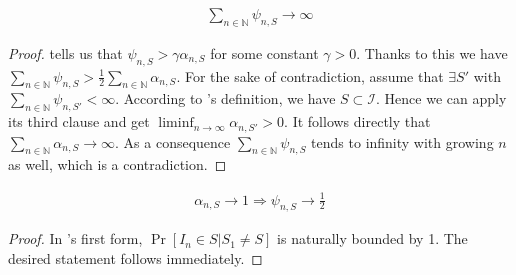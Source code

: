 \textbf{}
  \begin{align}
    \sum_{n \in \mathbb{N}} \psi_{n, S} \rightarrow \infty
  \end{align}
\begin{proof}
   tells us that $\psi_{n, S} > \gamma
  \alpha_{n, S}$ for some constant $\gamma > 0$. Thanks to this we have $\sum_{n
  \in \mathbb{N}} \psi_{n, S} > \frac{1}{2} \sum_{n \in \mathbb{N}} \alpha_{n,
  S}$. For the sake of contradiction, assume that $\exists S'$ with $\sum_{n \in
  \mathbb{N}} \psi_{n, S'} < \infty$. According to
  's definition, we have $S \subset \mathcal{I}$.
  Hence we can apply its third clause and get $\liminf_{n \rightarrow \infty}
  \alpha_{n, S'} > 0$. It follows directly that $\sum_{n \in \mathbb{N}}
  \alpha_{n, S} \rightarrow \infty$. As a consequence $\sum_{n \in \mathbb{N}}
  \psi_{n, S}$ tends to infinity with growing $n$ as well, which is a
  contradiction.
\end{proof}

\textbf{}
\begin{align}
  \alpha_{n, S} \rightarrow 1 \Rightarrow \psi_{n, S} \rightarrow \frac{1}{2}
\end{align}
\begin{proof}
  In 's first form,  $\Pr[I_n \in S | S_1
  \neq S]$ is naturally bounded by 1. The desired statement follows immediately.
\end{proof}

